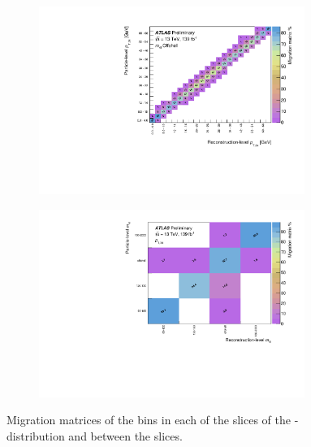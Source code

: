 \begin{figure}[htb]
  \begin{subfigure}{.49\textwidth}\centering\includegraphics[width = 0.95\textwidth]{Figures/m4l/UnfoldingStudies/v014_matrices/pt34_m4loffshellMatrix.pdf}\end{subfigure}
  \begin{subfigure}{.49\textwidth}\centering\includegraphics[width = 0.95\textwidth]{Figures/m4l/UnfoldingStudies/v014_matrices/pt34_m4lMatrix.pdf}\end{subfigure}
\caption{Migration matrices of the \ptZTwo bins in each of the \mFourL slices of the \ptZTwo-\mFourL distribution and between the slices.}
 \end{figure}



